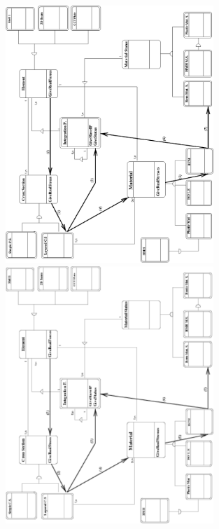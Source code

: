 \documentclass[a4paper]{article}
\begin{document}
\begin{figure}[tb]
\begin{htmlonly}
  \centerline{\includegraphics[width=0.7\textwidth]{struct1.eps}}
\end{htmlonly}
\ifpdf
\centerline{\includegraphics[width=0.7\textwidth]{struct1.pdf}}
\else

\end{figure}
\end{document}
